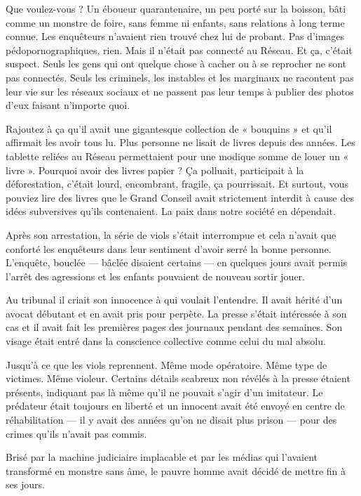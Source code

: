 Que voulez-vous ? Un éboueur quarantenaire, un peu porté sur la boisson, bâti comme un monstre de foire, sans femme ni
enfants, sans relations à long terme connue. Les enquêteurs n'avaient rien trouvé chez lui de probant. Pas d'images
pédopornographiques, rien. Mais il n'était pas connecté au Réseau. Et ça, c'était suspect. Seuls les gens qui ont
quelque chose à cacher ou à se reprocher ne sont pas connectés. Seuls les criminels, les instables et les marginaux ne
racontent pas leur vie sur les réseaux sociaux et ne passent pas leur temps à publier des photos d'eux faisant
n'importe quoi.

Rajoutez à ça qu'il avait une gigantesque collection de « bouquins » et qu'il affirmait les avoir tous lu. Plus
personne ne lisait de livres depuis des années. Les tablette reliées au Réseau permettaient pour une modique somme de
louer un « livre ». Pourquoi avoir des livres papier ? Ça polluait, participait à la déforestation, c'était lourd,
encombrant, fragile, ça pourrissait. Et surtout, vous pouviez lire des livres que le Grand Conseil avait strictement
interdit à cause des idées subversives qu'ils contenaient. La paix dans notre société en dépendait.

Après son arrestation, la série de viols s'était interrompue et cela n'avait que conforté les enquêteurs dans leur
sentiment d'avoir serré la bonne personne. L'enquête, bouclée — bâclée disaient certains — en quelques jours avait
permis l'arrêt des agressions et les enfants pouvaient de nouveau sortir jouer.

Au tribunal il criait son innocence à qui voulait l'entendre. Il avait hérité d'un avocat débutant et en avait pris pour
perpète. La presse s'était intéressée à son cas et il avait fait les premières pages des journaux pendant des semaines.
Son visage était entré dans la conscience collective comme celui du mal absolu.

Jusqu'à ce que les viols reprennent. Même mode opératoire. Même type de victimes. Même violeur. Certains détails
scabreux non révélés à la presse étaient présents, indiquant pas là même qu'il ne pouvait s'agir d'un imitateur. Le
prédateur était toujours en liberté et un innocent avait été envoyé en centre de réhabilitation — il y avait des années
qu'on ne disait plus prison — pour des crimes qu'ils n'avait pas commis.

Brisé par la machine judiciaire implacable et par les médias qui l'avaient transformé en monstre sans âme, le pauvre
homme avait décidé de mettre fin à ses jours.

